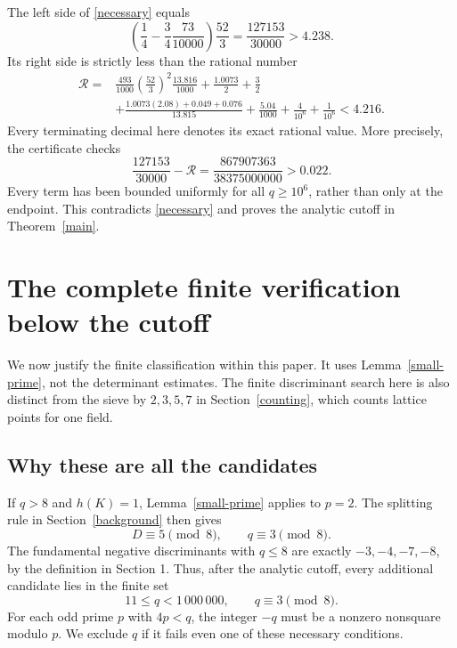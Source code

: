 \documentclass[11pt]{article}
\begin{document}
The left side of \eqref{necessary} equals
\[
 \left(\frac14-\frac34\frac{73}{10000}\right)\frac{52}{3}
                  =\frac{127153}{30000}>4.238.
\]
Its right side is strictly less than the rational number
\begin{align*}
 \mathcal R={}&\frac{493}{1000}\left(\frac{52}{3}\right)^2
                       \frac{13.816}{1000}
             +\frac{1.0073}{2}+\frac32\\
 &+\frac{1.0073(2.08)+0.049+0.076}{13.815}
             +\frac{5.04}{1000}+\frac4{10^6}+\frac1{10^6}
             <4.216.
\end{align*}
Every terminating decimal here denotes its exact rational value.
More precisely, the certificate checks
\[
 \frac{127153}{30000}-\mathcal R
   =\frac{867907363}{38375000000}>0.022.
\]
Every term has been bounded uniformly for all \(q\ge10^6\), rather
than only at the endpoint. This contradicts \eqref{necessary} and
proves the analytic cutoff in Theorem~\ref{main}.

\section{The complete finite verification below the cutoff}\label{finite}

We now justify the finite classification within this paper. It uses
Lemma~\ref{small-prime}, not the determinant estimates. The finite
discriminant search here is also distinct from the sieve by \(2,3,5,7\)
in Section~\ref{counting}, which counts lattice points for one field.

\subsection{Why these are all the candidates}

If \(q>8\) and \(h(K)=1\), Lemma~\ref{small-prime} applies to \(p=2\).
The splitting rule in Section~\ref{background} then gives
\[
 D\equiv5\pmod8,\qquad q\equiv3\pmod8.
\]
The fundamental negative discriminants with \(q\le8\) are exactly
\(-3,-4,-7,-8\), by the definition in Section 1. Thus, after the
analytic cutoff, every additional candidate lies in the finite set
\[
 11\le q<1\,000\,000,\qquad q\equiv3\pmod8.
\]
For each odd prime \(p\) with \(4p<q\), the integer \(-q\) must be a
nonzero nonsquare modulo \(p\). We exclude \(q\) if it fails even one
of these necessary conditions.
\end{document}
